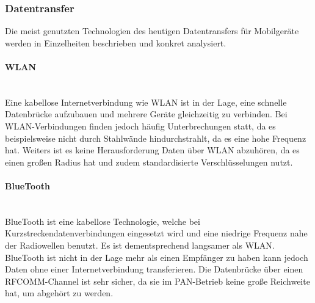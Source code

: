 \subsubsection{Datentransfer}
Die meist genutzten Technologien des heutigen Datentransfers für Mobilgeräte werden in Einzelheiten beschrieben und konkret analysiert.
\begin{indentE}\mbox{}
	\paragraph{WLAN}\mbox{}\\
	Eine kabellose Internetverbindung wie WLAN ist in der Lage, eine schnelle Datenbrücke aufzubauen und mehrere Geräte gleichzeitig zu verbinden. Bei WLAN-Verbindungen finden jedoch häufig Unterbrechungen statt, da es beispielsweise nicht durch Stahlwände hindurchstrahlt, da es eine hohe Frequenz hat. Weiters ist es keine Herausforderung Daten über WLAN abzuhören, da es einen großen Radius hat und zudem standardisierte Verschlüsselungen nutzt.
	
	\paragraph{BlueTooth}\mbox{}\\
	BlueTooth ist eine kabellose Technologie, welche bei Kurzstreckendatenverbindungen eingesetzt wird und eine niedrige Frequenz nahe der Radiowellen benutzt. Es ist dementsprechend langsamer als WLAN. BlueTooth ist nicht in der Lage mehr als einen Empfänger zu haben kann jedoch Daten ohne einer Internetverbindung transferieren. Die Datenbrücke über einen RFCOMM-Channel ist sehr sicher, da sie im PAN-Betrieb keine große Reichweite hat, um abgehört zu werden.
	

\end{indentE}
